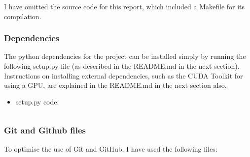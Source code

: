 \documentclass[./project-report/src/latex/project-report.tex]{subfiles}
\begin{document}
I have omitted the source code for this report, which included a Makefile for its compilation.

\subsubsection{Dependencies}

The python dependencies for the project can be installed simply by running the following setup.py file (as described in the README.md in the next section). Instructions on 
installing external dependencies, such as the CUDA Toolkit for using a GPU, are explained in the README.md in the next section also.

\begin{itemize}
    \item setup.py code:
        \inputminted{python}{./setup.py}
\end{itemize}

\subsubsection{Git and Github files}

To optimise the use of Git and GitHub, I have used the following files:
\end{document}
